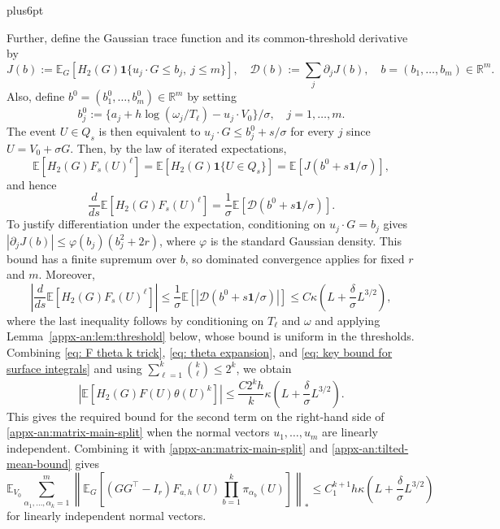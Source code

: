 \documentclass[11pt,letterpaper,twoside,leqno]{article}
\makeatletter
\theoremstyle{bookplain}
\theoremstyle{bookremark}
\renewenvironment{proof}[1][\proofname]{\par
  \pushQED{\qed}\normalfont\topsep6pt plus6pt\relax
  \trivlist\item[\hskip\labelsep\bfseries #1\@addpunct{.}]\ignorespaces
}{\popQED\endtrivlist\@endpefalse}
\newcommand{\E}{\mathbb E}
\newcommand{\R}{\mathbb R}
\newcommand{\ind}{\mathbf 1}
\makeatother
\begin{document}
\begin{proof}
\begingroup
Further, define the
Gaussian trace function and its common-threshold derivative by
\begin{equation}
 J(b):=\E_G[H_2(G)\ind\{u_j\cdot G\le b_j,\ j\le m\}],
 \quad \mathcal D(b):=\sum_j\partial_jJ(b),\quad b=(b_1,\dots,b_m)\in\R^m.
 \label{appx-an:threshold-functions}
\end{equation}
Also, define $b^0 = (b_1^0,\dots,b_m^0)\in\R^m$ by setting
\[
 b_j^0:=\{a_j+h\log(\omega_j/T_\ell)-u_j\cdot V_0\}/\sigma,\quad j=1,\dots, m.
\]
The event \(U\in Q_s\) is then equivalent to
\(u_j\cdot G\le b_j^0+s/\sigma\) for every \(j\) since $U = V_0 + \sigma G$. 
Then, by the law of iterated expectations,
\[
 \E[H_2(G)F_s(U)^\ell] = \E[H_2(G)\ind\{U\in Q_s\}]
 =\E[J(b^0+s\mathbf1/\sigma)],
\]
and hence
\[
 \frac{d}{ds}\E[H_2(G)F_s(U)^\ell]
 =\frac1\sigma\E[\mathcal D(b^0+s\mathbf1/\sigma)].
\]
To justify differentiation under the expectation, conditioning on
$u_j\cdot G=b_j$ gives
$|\partial_jJ(b)|\le\varphi(b_j)(b_j^2+2r)$, where $\varphi$ is the
standard Gaussian density. This bound has a finite supremum over $b$,
so dominated convergence applies for fixed $r$ and $m$. Moreover,
\begin{equation}\label{eq: key bound for surface integrals}
 \left|\frac{d}{ds}\E[H_2(G)F_s(U)^\ell]\right|
 \le\frac1\sigma\E[|\mathcal D(b^0+s\mathbf1/\sigma)|]
 \le C{\kappa\left(L+\frac\delta\sigma L^{3/2}\right)},
\end{equation}
where the last inequality follows by conditioning on $T_\ell$ and
$\omega$ and applying Lemma~\ref{appx-an:lem:threshold} below, whose
bound is uniform in the thresholds. Combining \eqref{eq: F theta k trick}, \eqref{eq: theta expansion}, and \eqref{eq: key bound for surface integrals} and using
\(\sum_{\ell=1}^k\binom{k}{\ell}\le2^k\), we obtain
\[
 \left|\E[H_2(G)F(U)\theta(U)^k]\right|
 \le\frac{C2^kh}{k}
       {\kappa\left(L+\frac\delta\sigma L^{3/2}\right)}.
\]
This gives the required bound for the second term on the right-hand side of \eqref{appx-an:matrix-main-split} when the normal vectors $u_1,\dots, u_m$ are linearly independent. Combining it with \eqref{appx-an:matrix-main-split} and
\eqref{appx-an:tilted-mean-bound} gives
\begin{equation}
 \E_{V_0}\sum_{\alpha_1,\ldots,\alpha_k=1}^m
 \left\|\E_G\left[(GG^\top-I_r)F_{a,h}(U)
              \prod_{b=1}^k\pi_{\alpha_b}(U)\right]\right\|_*
 \le C_1^{k+1}h{\kappa\left(L+\frac\delta\sigma L^{3/2}\right)}
 \label{appx-an:matrix-bound-unsimplified}
\end{equation}
for linearly independent normal vectors.




\end{proof}
\end{document}
